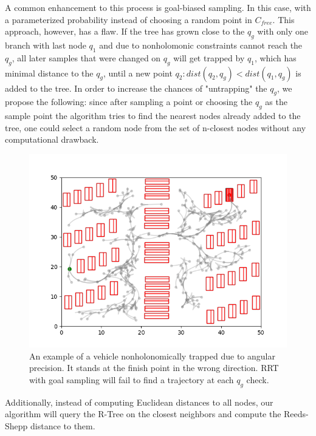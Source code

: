 \documentclass[a4paper,12pt]{article}
\DeclareRobustCommand{\[}{\begin{equation}}
\DeclareRobustCommand{\]}{\end{equation}}
\numberwithin{equation}{section}
\numberwithin{algorithm}{subsection}
\begin{document}
A common enhancement to this process is goal-biased sampling. In this case, with a parameterized probability instead of choosing a random point in $C_{free}$. This approach, however,
has a flaw. If the tree has grown close to the $q_g$ with only one branch with last node $q_1$ and due to nonholomonic constraints cannot reach the $q_g$, all later samples that
were changed on $q_g$ will get trapped by $q_1$, which has minimal distance to the $q_g$, until a new point $q_2: dist(q_2, q_g) < dist(q_1, q_g)$ is added to the tree.
In order to increase the chances of "untrapping" the $q_g$, we propose the following: since after sampling a point or choosing the $q_g$ as the sample point the algorithm tries to 
find the nearest nodes already added to the tree, one could select a random node from the set of n-closest nodes without any computational drawback.

\begin{figure}[H]
\begin{center}
\includegraphics[scale=0.7]{images/car_trapped.png}
\captionsetup{width=0.6\textwidth}
\caption{An example of a vehicle nonholonomically trapped due to angular precision. It stands at the finish point in the wrong direction. RRT with goal sampling will fail to find a trajectory at each $q_g$ check.}
\end{center}
\end{figure}

Additionally, instead of computing Euclidean distances to all nodes, our algorithm will query the R-Tree on the closest neighbors and compute the Reeds-Shepp distance to them. 
\end{document}
